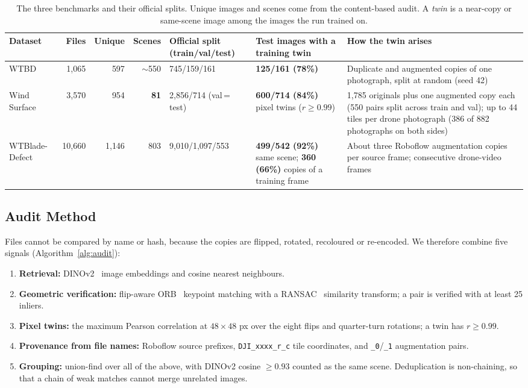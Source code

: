\begin{table}[!t]
\centering
\caption{The three benchmarks and their official splits. Unique images and scenes come from the content-based audit. A \emph{twin} is a near-copy or same-scene image among the images the run trained on.}
\label{tab:audit}
\footnotesize
\begin{tabularx}{\textwidth}{@{}p{} r r r p{} p{} X@{}}
\toprule
Dataset & Files & Unique & Scenes & Official split (train/val/test) & Test images with a training twin & How the twin arises \\
\midrule
WTBD~\cite{wtbd} & 1{,}065 & 597 & $\sim$550 & 745/159/161 & \textbf{125/161 (78\%)} & Duplicate and augmented copies of one photograph, split at random (seed 42) \\
Wind Surface~\cite{gfdyolox} & 3{,}570 & 954 & \textbf{81} & 2{,}856/714 (val\,=\,test) & \textbf{600/714 (84\%)} pixel twins ($r\geq0.99$) & 1{,}785 originals plus one augmented copy each (550 pairs split across train and val); up to 44 tiles per drone photograph (386 of 882 photographs on both sides) \\
WTBlade-Defect~\cite{fengche} & 10{,}660 & 1{,}146 & 803 & 9{,}010/1{,}097/553 & \textbf{499/542 (92\%)} same scene; \textbf{360 (66\%)} copies of a training frame & About three Roboflow augmentation copies per source frame; consecutive drone-video frames \\
\bottomrule
\end{tabularx}
\end{table}

\subsection{Audit Method}
Files cannot be compared by name or hash, because the copies are flipped, rotated, recoloured or re-encoded. We therefore combine five signals (Algorithm~\ref{alg:audit}):
\begin{enumerate}
\item \textbf{Retrieval:} DINOv2~\cite{dinov2} image embeddings and cosine nearest neighbours.
\item \textbf{Geometric verification:} flip-aware ORB~\cite{orb} keypoint matching with a RANSAC~\cite{ransac} similarity transform; a pair is verified with at least 25 inliers.
\item \textbf{Pixel twins:} the maximum Pearson correlation at $48\times48$ px over the eight flips and quarter-turn rotations; a twin has $r\geq 0.99$.
\item \textbf{Provenance from file names:} Roboflow source prefixes, \texttt{DJI\_xxxx\_r\_c} tile coordinates, and \texttt{\_0}/\texttt{\_1} augmentation pairs.
\item \textbf{Grouping:} union-find over all of the above, with DINOv2 cosine $\geq 0.93$ counted as the same scene. Deduplication is non-chaining, so that a chain of weak matches cannot merge unrelated images.
\end{enumerate}

